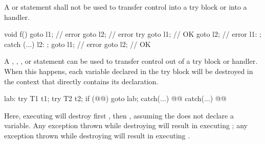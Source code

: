 \pnum
{}%
%
%
%
%
%
A  or  statement shall not be used to transfer control
into a try block or into a handler.
\begin{example}
\begin{codeblock}
void f() {
  goto l1;          // error
  goto l2;          // error
  try {
    goto l1;        // OK
    goto l2;        // error
    l1: ;
  } catch (...) {
    l2: ;
    goto l1;        // error
    goto l2;        // OK
  }
}

\end{codeblock}
\end{example}
%
%
%
%
%
%
%
%
A
,
,
,
or
statement can be used to transfer control out of
a try block or handler.
When this happens, each variable declared in the try block
will be destroyed in the context that
directly contains its declaration.
\begin{example}
\begin{codeblock}
lab:  try {
  T1 t1;
  try {
    T2 t2;
    if (@@)
      goto lab;
    } catch(...) { @@ }
  } catch(...) { @@ }
\end{codeblock}

Here, executing
will destroy first
,
then
,
assuming the
does not declare a variable.
Any exception thrown while destroying
will result in executing
;
any exception thrown while destroying
will result in executing
.
\end{example}

